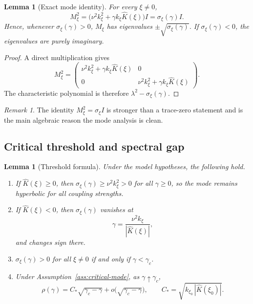 \documentclass[11pt]{amsart}
\newtheorem{lemma}[theorem]{Lemma}
\theoremstyle{definition}
\theoremstyle{remark}
\newtheorem{remark}[theorem]{Remark}
\newcommand{\Kh}{\widehat{K}}
\newcommand{\gamc}{\gamma_c}
\begin{document}
\begin{lemma}[Exact mode identity]
\label{lem:mode-identity}
For every $\xi\neq 0$,
\[
M_\xi^2 = \bigl(\nu^2k_\xi^2+\gamma k_\xi\Kh(\xi)\bigr) I
= \sigma_\xi(\gamma) I.
\]
Hence, whenever $\sigma_\xi(\gamma)>0$, $M_\xi$ has eigenvalues $\pm\sqrt{\sigma_\xi(\gamma)}$.
If $\sigma_\xi(\gamma)<0$, the eigenvalues are purely imaginary.
\end{lemma}

\begin{proof}
A direct multiplication gives
\[
M_\xi^2=
\begin{pmatrix}
\nu^2k_\xi^2+\gamma k_\xi\Kh(\xi) & 0\\
0 & \nu^2k_\xi^2+\gamma k_\xi\Kh(\xi)
\end{pmatrix}.
\]
The characteristic polynomial is therefore $\lambda^2-\sigma_\xi(\gamma)$.
\end{proof}

\begin{remark}
The identity $M_\xi^2=\sigma_\xi I$ is stronger than a trace-zero statement and is the main algebraic reason the mode analysis is clean.
\end{remark}

\subsection{Critical threshold and spectral gap}
\label{sub:threshold}

\begin{lemma}[Threshold formula]
\label{lem:threshold}
Under the model hypotheses, the following hold.
\begin{enumerate}[label=\textup{(\roman*)},leftmargin=2em]
\item If $\Kh(\xi)\ge 0$, then $\sigma_\xi(\gamma)\ge \nu^2k_\xi^2>0$ for all $\gamma\ge 0$,
so the mode remains hyperbolic for all coupling strengths.
\item If $\Kh(\xi)<0$, then $\sigma_\xi(\gamma)$ vanishes at
\[
\gamma=\frac{\nu^2k_\xi}{|\Kh(\xi)|},
\]
and changes sign there.
\item $\sigma_\xi(\gamma)>0$ for all $\xi\neq 0$ if and only if $\gamma<\gamc$.
\item Under Assumption~\ref{ass:critical-mode}, as $\gamma\uparrow\gamc$,
\[
\rho(\gamma) = C_\ast\sqrt{\gamc-\gamma}+o\!\bigl(\sqrt{\gamc-\gamma}\bigr),
\qquad
C_\ast = \sqrt{k_{\xi_0}\,|\Kh(\xi_0)|}.
\]
\end{enumerate}
\end{lemma}
\end{document}

